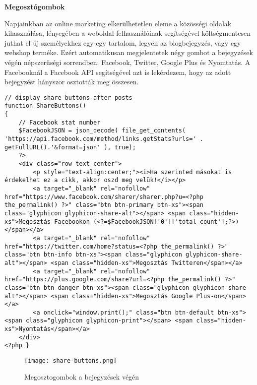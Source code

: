 \newpage

\textbf{Megosztógombok}

Napjainkban az online marketing elkerülhetetlen eleme a közösségi oldalak kihasználása, lényegében a weboldal felhasználóinak segítségével költségmentesen juthat el új személyekhez egy-egy tartalom, legyen az blogbejegyzés, vagy egy webshop terméke. Ezért automatikusan megjelentetek négy gombot a bejegyzések végén népszerűségi sorrendben: Facebook, Twitter, Google Plus és Nyomtatás. A Facebooknál a Facebook API segítségével azt is lekérdezem, hogy az adott bejegyzést hányszor osztották meg összesen.

\begin{lstlisting}
// display share buttons after posts
function ShareButtons()
{
	// Facebook stat number
	$FacebookJSON = json_decode( file_get_contents( 'https://api.facebook.com/method/links.getStats?urls=' . getFullURL().'&format=json' ), true);
	?>
	<div class="row text-center">
		<p style="text-align:center;"><i>Ha szerinted másokat is érdekelhet ez a cikk, akkor oszd meg velük!</i></p>
		<a target="_blank" rel="nofollow" href="https://www.facebook.com/sharer/sharer.php?u=<?php the_permalink() ?>" class="btn btn-primary btn-xs"><span class="glyphicon glyphicon-share-alt"></span> <span class="hidden-xs">Megosztás Facebookon (<?=$FacebookJSON['0']['total_count'];?>)</span></a>
		<a target="_blank" rel="nofollow" href="https://twitter.com/home?status=<?php the_permalink() ?>" class="btn btn-info btn-xs"><span class="glyphicon glyphicon-share-alt"></span> <span class="hidden-xs">Megosztás Twitteren</span></a>
		<a target="_blank" rel="nofollow" href="https://plus.google.com/share?url=<?php the_permalink() ?>" class="btn btn-danger btn-xs"><span class="glyphicon glyphicon-share-alt"></span> <span class="hidden-xs">Megosztás Google Plus-on</span></a>
		<a onclick="window.print();" class="btn btn-default btn-xs"><span class="glyphicon glyphicon-print"></span> <span class="hidden-xs">Nyomtatás</span></a>
	</div>
<?php }

\end{lstlisting}

\begin{figure}
	\texttt{[image: share-buttons.png]}
	\caption{Megosztogombok a bejegyzések végén}
\end{figure}